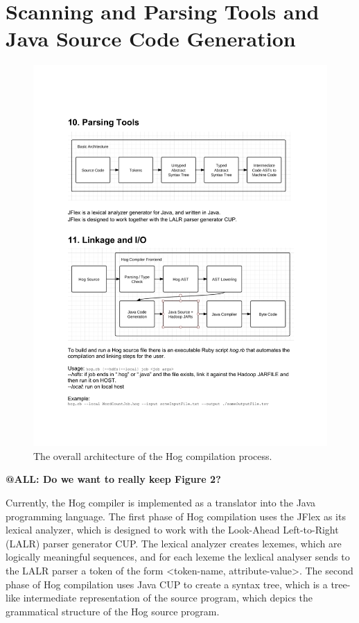 \documentclass{article}
\begin{document}

\section{Scanning and Parsing Tools and Java Source Code Generation} %
\label{sec:parsing_tools}

\begin{center}
\begin{figure}
  \label{fig:parser_architecture}
  \includegraphics[width=1.0\textwidth]{img/parser_architecture.pdf}
  \caption{The overall architecture of the Hog compilation process.}
\end{figure}
\end{center}

\textbf{@ALL: Do we want to really keep Figure 2?}

Currently, the Hog compiler is implemented as a translator into the Java programming 
language. The first phase of Hog compilation uses the JFlex as its lexical analyzer,
which is designed to work with the Look-Ahead Left-to-Right (LALR) parser generator
CUP. The lexical analyzer creates lexemes, which are logically meaningful sequences,
and for each lexeme the lexlical analyser sends to the LALR parser a token of the
form <token-name, attribute-value>. The second phase of Hog compilation uses Java CUP
to create a syntax tree, which is a tree-like intermediate representation of the source
program, which depics the grammatical structure of the Hog source program.
\end{document}
